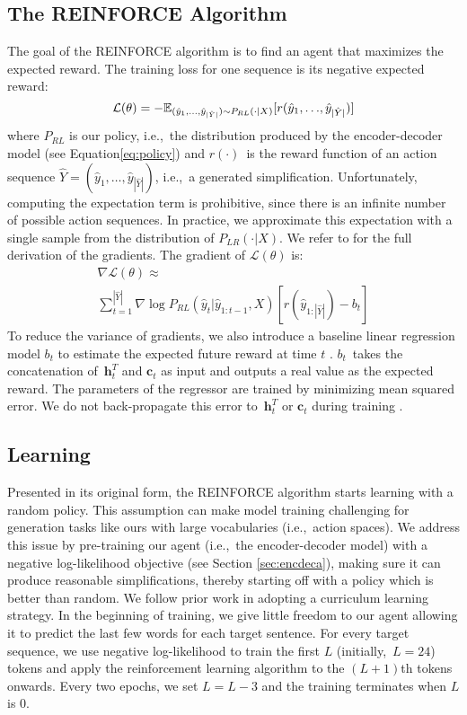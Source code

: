 \documentclass[11pt,letterpaper]{article}
\begin{document}
\subsection{The REINFORCE Algorithm}
The goal of the REINFORCE algorithm is to find an agent that maximizes
the expected reward. The training loss for one sequence is its 
negative expected reward:
\begin{equation*}
\mathcal{L}(\theta) = - \mathbb{E}_{ (\hat{y}_1,\dots,\hat{y}_{|\hat{Y}|}) \sim P_{RL}(\cdot|X)} [ r( \hat{y}_1,{\small \dots},\hat{y}_{|\hat{Y}|} ) ]
\end{equation*}
where $P_{RL}$ is our policy, i.e.,~the distribution produced by the
encoder-decoder model (see Equation\eqref{eq:policy}) and
$r(\cdot)$~is the reward function of an action sequence
$\hat{Y} = ( \hat{y}_1,\dots,\hat{y}_{|\hat{Y}|} )$, i.e.,~a generated
simplification. Unfortunately, computing the expectation term is
prohibitive, since there is an infinite number of possible action
sequences. In practice, we approximate this expectation with a single
sample from the distribution of $P_{LR}(\cdot|X)$. We refer to
 for the full derivation of the
gradients. The gradient of $\mathcal{L}(\theta)$ is:
\[
\begin{array}{ll}
\nabla\mathcal{L}(\theta)\approx \\
\sum_{t=1}^{|\hat{Y}|}\nabla \log P_{RL}(\hat{y}_t|\hat{y}_{1:t-1}, X) [r(\hat{y}_{1:|\hat{Y}|}) - b_t ]
\end{array}
\]
To reduce the variance of gradients, we also introduce a baseline
linear regression model $b_t$ to estimate the expected future reward
at time $t$ \cite{ranzato2016sequence}. $b_t$~takes the concatenation
of~$\mathbf{h}_t^T$ and $\mathbf{c}_t$ as input and outputs a real
value as the expected reward. The parameters of the regressor are
trained by minimizing mean squared error. We do not back-propagate
this error to~$\mathbf{h}_t^T$ or $\mathbf{c}_t$ during training
\cite{ranzato2016sequence}.


\subsection{Learning}
\label{sec:learning}
Presented in its original form, the REINFORCE algorithm starts
learning with a random policy. This assumption can make model training
challenging for generation tasks like ours with large vocabularies
(i.e.,~action spaces). We address this issue by pre-training our agent
(i.e.,~the encoder-decoder model) with a negative log-likelihood
objective (see Section \ref{sec:encdeca}), making sure it can produce
reasonable simplifications, thereby starting off with a policy which
is better than random. We follow prior work \cite{ranzato2016sequence}
in adopting a curriculum learning strategy. In the beginning of
training, we give little freedom to our agent allowing it to predict
the last few words for each target sentence. For every target sequence, we
use negative log-likelihood to train the first $L$ (initially,~$L=24$)
tokens and apply the reinforcement learning algorithm to the $(L+1)$th
tokens onwards. Every two epochs, we set \mbox{$L=L-3$} and the
training terminates when $L$ is 0.
\end{document}
